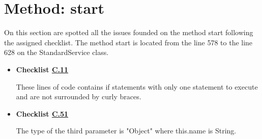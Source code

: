 \documentclass[../../../../codeInspection.tex]{subfiles}
\begin{document}
	\section{Method: start}

		On this section are spotted all the issues founded on the method start following the assigned checklist.
		The method start is located from the line 578 to the line 628 on the StandardService class.
		\begin{itemize}

			\item \textbf{Checklist \hyperref[C:11]{C.11}}

				  

				  

				  These lines of code contains if statements with only one statement to execute and are not surrounded by curly braces.

			\item \textbf{Checklist \hyperref[C:51]{C.51}}

				  

				  The type of the third parameter is "Object" where this.name is String.

		\end{itemize}
\end{document}
